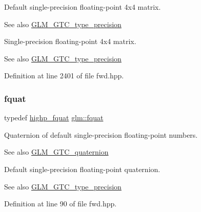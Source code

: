 Default single-\/precision floating-\/point 4x4 matrix. \begin{DoxySeeAlso}{See also}
\hyperlink{group__gtc__type__precision}{G\+L\+M\+\_\+\+G\+T\+C\+\_\+type\+\_\+precision}
\end{DoxySeeAlso}
Single-\/precision floating-\/point 4x4 matrix. \begin{DoxySeeAlso}{See also}
\hyperlink{group__gtc__type__precision}{G\+L\+M\+\_\+\+G\+T\+C\+\_\+type\+\_\+precision} 
\end{DoxySeeAlso}


Definition at line 2401 of file fwd.\+hpp.

\mbox{\label{group__gtc__type__precision_gaa95d73f08018f3864c6ae08dbf1c59f2}} 
\subsubsection{\texorpdfstring{fquat}{fquat}}
{\footnotesize\ttfamily typedef \hyperlink{namespaceglm_ad1acf6af4ae4af94dfec8814b058d5eb}{highp\+\_\+fquat} \hyperlink{group__gtc__type__precision_gaa95d73f08018f3864c6ae08dbf1c59f2}{glm\+::fquat}}

Quaternion of default single-\/precision floating-\/point numbers.

\begin{DoxySeeAlso}{See also}
\hyperlink{group__gtc__quaternion}{G\+L\+M\+\_\+\+G\+T\+C\+\_\+quaternion}
\end{DoxySeeAlso}
Default single-\/precision floating-\/point quaternion. \begin{DoxySeeAlso}{See also}
\hyperlink{group__gtc__type__precision}{G\+L\+M\+\_\+\+G\+T\+C\+\_\+type\+\_\+precision} 
\end{DoxySeeAlso}


Definition at line 90 of file fwd.\+hpp.

\mbox{\label{group__gtc__type__precision_gab927d62f22fa57461367011950cec650}} 
